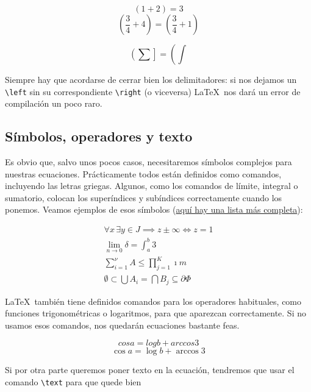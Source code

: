 \begin{LTXexample}[pos=r]
\[ (1 + 2) = 3\]
\[ (\frac{3}{4} + 4) = \left(\frac{3}{4} + 1 \right)\]

\[ \left(\sum \right] = \left(\int \right. \]
\end{LTXexample}

Siempre hay que acordarse de cerrar bien los delimitadores: si nos dejamos un \verb|\left| sin su correspondiente \verb|\right| (o viceversa) \LaTeX\ nos dará un error de compilación un poco raro.

\subsection{Símbolos, operadores y texto}
\label{sec:SimbolosOperadoresTexto}

Es obvio que, salvo unos pocos casos, necesitaremos símbolos complejos para nuestras ecuaciones. Prácticamente todos están definidos como comandos, incluyendo las letras griegas. Algunos, como los comandos de límite, integral o sumatorio, colocan los superíndices y subíndices correctamente cuando los ponemos. Veamos ejemplos de esos símbolos (\href{https://en.wikibooks.org/wiki/LaTeX/Mathematics#List_of_Mathematical_Symbols}{aquí hay una lista más completa}):

\begin{LTXexample}[pos=r]
\begin{gather*}
\forall x \,\exists y \in J \implies z \pm \infty \iff z = 1\\
\lim_{n\to 0} \delta = \int_a^b 3 \\
\sum_{i=1}^\nu A \leq \prod_{j=1}^K \imath m \\
\emptyset \subset \bigcup A_i = \bigcap B_j \subseteq \partial \Phi
\end{gather*}
\end{LTXexample}

\LaTeX\ también tiene definidos comandos para los operadores habituales, como funciones trigonométricas o logaritmos, para que aparezcan correctamente. Si no usamos esos comandos, nos quedarán ecuaciones bastante feas.

\begin{LTXexample}[pos=r]
\[ cos a = log b + arccos 3 \]
\[ \cos a = \log b + \arccos 3 \]
\end{LTXexample}

Si por otra parte queremos poner texto en la ecuación, tendremos que usar el comando \verb|\text| para que quede bien


